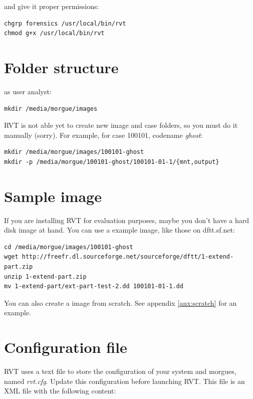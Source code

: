 \documentclass[a4paper,11pt,oneside]{report}
\begin{document}
and give it proper permissions:

\begin{verbatim}
chgrp forensics /usr/local/bin/rvt
chmod g+x /usr/local/bin/rvt
\end{verbatim}


\section{Folder structure}

as user analyst:

\begin{verbatim}
mkdir /media/morgue/images
\end{verbatim}

RVT is not able yet to create new image and case folders, so you must do it manually (sorry). For example, for case 100101, codename \emph{ghost}:

\begin{verbatim}
mkdir /media/morgue/images/100101-ghost
mkdir -p /media/morgue/100101-ghost/100101-01-1/{mnt,output}
\end{verbatim}


\section{Sample image}

If you are installing RVT for evaluation purposes, maybe you don't have a hard disk image at hand. You can use a example image, like those on dftt.sf.net:

\begin{verbatim}
cd /media/morgue/images/100101-ghost
wget http://freefr.dl.sourceforge.net/sourceforge/dftt/1-extend-part.zip
unzip 1-extend-part.zip
mv 1-extend-part/ext-part-test-2.dd 100101-01-1.dd
\end{verbatim}

You can also create a image from scratch. See appendix \ref{anx:scratch} for an example.



\section{Configuration file}

RVT uses a text file to store the configuration of your system and morgues, named \emph{rvt.cfg}. Update this configuration before launching RVT. This file is an XML file with the following content:
\end{document}
